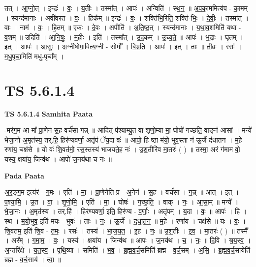 \documentclass[17pt]{extarticle}
\begin{document}
तत् । आ॒प्नो॒त् । इन्द्रः॑ । वः॒ । य॒तीः । तस्मा᳚त् । आपः॑ । अन्विति॑ । स्थ॒न॒ ॥ अ॒प॒का॒ममित्य॑प - का॒मम् । स्यन्द॑मानाः । अवी॑वरत । वः॒ । हिक᳚म् ॥ इन्द्रः॑ । वः॒ । शक्ति॑भि॒रिति॒ शक्ति॑-भिः॒ । दे॒वीः॒ । तस्मा᳚त् । वाः । नाम॑ । वः॒ । हि॒तम् ॥ एकः॑ । दे॒वः । अपीति॑ । अ॒ति॒ष्ठ॒त् । स्यन्द॑मानाः । य॒था॒व॒शमिति॑ यथा - व॒शम् ॥ उदिति॑ । आ॒नि॒षुः॒ । म॒हीः । इति॑ । तस्मा᳚त् । उ॒द॒कम् । उ॒च्य॒ते॒ ॥ आपः॑ । भ॒द्राः । घृ॒तम् । इत् । आपः॑ । आ॒सुः॒ । अ॒ग्नीषोमा॒वित्य॒ग्नी - सोमौ᳚ । बि॒भ्र॒ति॒ । आपः॑ । इत् । ताः ॥ ती॒व्रः । रसः॑ । म॒धु॒पृचा॒मिति॑ मधु-पृचा᳚म् ।  \newline





\section{ TS 5.6.1.4 }

\textbf{TS 5.6.1.4 } \newline
\textbf{Samhita Paata} \newline

-मरंग॒म आ मा᳚ प्रा॒णेन॑ स॒ह वर्च॑सा गन्न् ॥ आदित् प॑श्याम्यु॒त वा॑ शृणो॒म्या मा॒ घोषो॑ गच्छति॒ वाङ्न॑ आसां । मन्ये॑ भेजा॒नो अ॒मृत॑स्य॒ तर्.हि॒ हिर॑ण्यवर्णा॒ अतृ॑पं ॅय॒दा वः॑ ॥ आपो॒ हि ष्ठा म॑यो॒ भुव॒स्ता न॑ ऊ॒र्जे द॑धातन । म॒हे रणा॑य॒ चक्ष॑से ॥ यो वः॑ शि॒वत॑मो॒ रस॒स्तस्य॑ भाजयते॒ह नः॑ । उ॒श॒तीरि॑व मा॒तरः॑ ( ) ॥ तस्मा॒ अरं ग॑माम वो॒ यस्य॒ क्षया॑य॒ जिन्व॑थ । आपो॑ ज॒नय॑था च नः ॥ \newline

\textbf{Pada Paata} \newline

अ॒र॒ङ्ग॒म इत्य॑रं - ग॒मः । एति॑ । मा॒ । प्रा॒णेनेति॑ प्र - अ॒नेन॑ । स॒ह । वर्च॑सा । ग॒न्न् ॥ आत् । इत् । प॒श्या॒मि॒ । उ॒त । वा॒ । शृ॒णो॒मि॒ । एति॑ । मा॒ । घोषः॑ । ग॒च्छ॒ति॒ । वाक् । नः॒ । आ॒सा॒म् ॥ मन्ये᳚ । भे॒जा॒नः । अ॒मृत॑स्य । तर्.हि॑ । हिर॑ण्यवर्णा॒ इति॒ हिर॑ण्य - व॒र्णाः॒ । अतृ॑पम् । य॒दा । वः॒ ॥ आपः॑ । हि । स्थ । म॒यो॒भुव॒ इति॑ मयः - भुवः॑ । ताः । नः॒ । ऊ॒र्जे । द॒धा॒त॒न॒ ॥ म॒हे । रणा॑य । चक्ष॑से ॥ यः । वः॒ । शि॒वत॑म॒ इति॑ शि॒व - त॒मः॒ । रसः॑ । तस्य॑ । भा॒ज॒य॒त॒ । इ॒ह । नः॒ ॥ उ॒श॒तीः । इ॒व॒ । मा॒तरः॑ ( ) ॥ तस्मै᳚ । अर᳚म् । ग॒मा॒म॒ । वः॒ । यस्य॑ । क्षया॑य । जिन्व॑थ ॥ आपः॑ । ज॒नय॑थ । च॒ । नः॒ ॥ दि॒वि । श्र॒य॒स्व॒ । अ॒न्तरि॑क्षे । य॒त॒स्व॒ । पृ॒थि॒व्या । समिति॑ । भ॒व॒ । ब्र॒ह्म॒व॒र्च॒समिति॑ ब्रह्म - व॒र्च॒सम् । अ॒सि॒ । ब्र॒ह्म॒व॒र्च॒सायेति॑ ब्रह्म - व॒र्च॒साय॑ । त्वा॒ ॥  \newline
\end{document}
